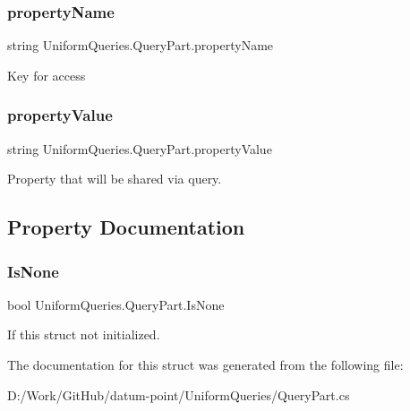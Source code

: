 \subsubsection{\texorpdfstring{property\+Name}{propertyName}}
{\footnotesize\ttfamily string Uniform\+Queries.\+Query\+Part.\+property\+Name}



Key for access 

\mbox{\label{struct_uniform_queries_1_1_query_part_adb297c368ab4900f751d60ceffda0a99}} 
\subsubsection{\texorpdfstring{property\+Value}{propertyValue}}
{\footnotesize\ttfamily string Uniform\+Queries.\+Query\+Part.\+property\+Value}



Property that will be shared via query. 



\subsection{Property Documentation}
\mbox{\label{struct_uniform_queries_1_1_query_part_af380375ca82e9dc2eecf899b5933fe2b}} 
\subsubsection{\texorpdfstring{Is\+None}{IsNone}}
{\footnotesize\ttfamily bool Uniform\+Queries.\+Query\+Part.\+Is\+None\hspace{0.3cm}{\ttfamily [get]}}



If this struct not initialized. 



The documentation for this struct was generated from the following file\+:\begin{DoxyCompactItemize}
\item 
D\+:/\+Work/\+Git\+Hub/datum-\/point/\+Uniform\+Queries/Query\+Part.\+cs\end{DoxyCompactItemize}
